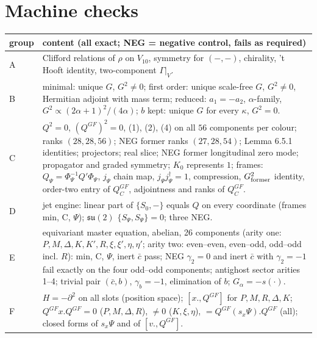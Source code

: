 \documentclass[11pt]{article}
\theoremstyle{plain}
\theoremstyle{definition}
\numberwithin{equation}{section}
\begin{document}
\section{Machine checks}

\begin{tabular}{l|p{11.5cm}}
\toprule
group & content (all exact; NEG = negative control, fails as required) \\
\midrule
A & Clifford relations of $\rho$ on $V_{10}$, symmetry for $(-,-)$, chirality, 't Hooft identity, two-component $\Gamma|_V$. \\
B & minimal: unique $G$, $G^2\neq0$; first order: unique scale-free $G$, $G^2\neq0$, Hermitian adjoint with mass term; reduced: $a_1=-a_2$, $\alpha$-family, $G^2\propto(2\alpha+1)^2/(4\alpha)$; $b$ kept: unique $G$ for every $\kappa$, $G^2=0$. \\
C & $Q^2=0$, $(Q^{GF})^2=0$, (1), (2), (4) on all $56$ components per colour; ranks $(28,28,56)$; NEG former ranks $(27,28,54)$; Lemma 6.5.1 identities; projectors; real slice; NEG former longitudinal zero mode; propagator and graded symmetry; $K_0$ represents $1$; frames: $Q_\Psi=\Phi_\Psi^{-1}Q'\Phi_\Psi$, $j_\Psi$ chain map, $j_\Psi j_\Psi^\dagger=1$, compression, $G_{\rm former}^2$ identity, order-two entry of $Q^{GF}_C$, adjointness and ranks of $Q^{GF}_C$. \\
D & jet engine: linear part of $\{S_0,-\}$ equals $Q$ on every coordinate (frames min, C, $\Psi$); $\mathfrak{su}(2)$ $\{S_\Psi,S_\Psi\}=0$; three NEG. \\
E & equivariant master equation, abelian, 26 components (arity one: $P,M,\Delta,K,K',R,\xi,\xi',\eta,\eta'$; arity two: even--even, even--odd, odd--odd incl. $R$): min, C, $\Psi$, inert $\bar c$ pass; NEG $\gamma_2=0$ and inert $\bar c$ with $\gamma_2=-1$ fail exactly on the four odd--odd components; antighost sector arities 1--4; trivial pair $(\bar c,b)$, $\gamma_b=-1$, elimination of $b$; $G_\alpha=-s(\cdot)$. \\
F & $H=-\partial^2$ on all slots (position space); $[x.,Q^{GF}]$ for $P,M,R,\Delta,K$; $Q^{GF}x.Q^{GF}=0$ ($P,M,\Delta,R$), $\neq0$ ($K,\xi,\eta$), $=Q^{GF}(s_x\Psi).Q^{GF}$ (all); closed forms of $s_x\Psi$ and of $[v.,Q^{GF}]$. \\
\bottomrule
\end{tabular}
\end{document}

